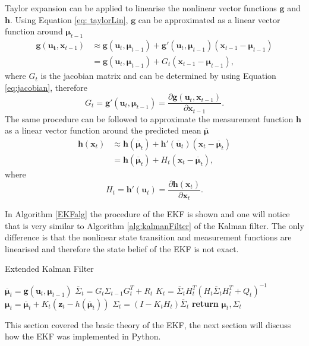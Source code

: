 \documentclass[12pt,oneside,openany,a4paper, %
afrikaans,english,
]{memoir}
\numberwithin{equation}{chapter}
\begin{document}
Taylor expansion can be applied to linearise the nonlinear vector functions $\bm{g}$ and $\bm{h}$. Using  Equation \ref{eq: taylorLin}, $\bm{g}$ can be approximated as a linear vector function around $\bm{\mu}_{t-1}$
\begin{equation}\label{eq:linear_taylor}
\begin{split}
\bm{g}(\bm{u_t}, \bm{x}_{t-1}) & \approx \bm{g}(\bm{u}_t, \bm{\mu}_{t-1}) + \bm{g}'(\bm{u}_t, \bm{\mu}_{t-1})(\bm{x}_{t-1} - \bm{\mu}_{t-1})\\
& = \bm{g}(\bm{u}_t, \bm{\mu}_{t-1}) + G_t(\bm{x}_{t-1} - 
\bm{\mu}_{t-1}),
\end{split}  
\end{equation}
where $G_t$ is the jacobian matrix and can be determined by using Equation \ref{eq:jacobian}, therefore
\begin{equation}\label{eq:Gt}
G_t = \bm{g}'(\bm{u}_t, \bm{\mu}_{t-1}) = \frac{\partial \bm{g}(\bm{u}_t, \bm{x}_{t-1})}{\partial \bm{x}_{t-1}}.
\end{equation}
The same procedure can be followed to approximate the measurement function $\bm{h}$ as a linear vector function around the predicted mean $\overline{\bm{\mu}}$
\begin{equation}
\begin{split}
\bm{h}(\bm{x}_{t}) & \approx \bm{h}(\bm{\overline{\mu}}_{t}) + \bm{h}'(\bm{\overline{u}}_t)(\bm{x}_{t} - \bm{\overline{\mu}}_{t})\\
& = \bm{h}(\bm{\overline{\mu}}_t) + H_t(\bm{x}_{t} - 
\bm{\overline{\mu}}_{t}),
\end{split}  
\end{equation}
where
\begin{equation}\label{eq:Ht}
H_t = \bm{h}'(\bm{u}_t) = \frac{\partial \bm{h}(\bm{x}_{t})}{\partial \bm{x}_{t}}.
\end{equation}

In Algorithm \ref{EKFalg} the procedure of the EKF is shown and one will notice that is very similar to Algorithm \ref{alg:kalmanFilter} of the Kalman filter. The only difference is that the nonlinear state transition and measurement functions are linearised and therefore the state belief of the EKF is not exact.




\begin{algorithm}
\caption{Extended Kalman Filter}\label{EKFalg}
\begin{algorithmic}[1]
\State $\overline{\bm{\mu}}_t = \bm{g}(\bm{u}_t, \bm{\mu}_{t-1})$
\State $\overline{\Sigma}_t = G_t \Sigma_{t-1} G_t^T + R_t$
\State $K_t = \overline{\Sigma}_t H_t^T(H_t\overline{\Sigma}_t H_t^T + Q_t)^{-1}$
\State $\bm{\mu}_t = \overline{\bm{\mu}}_t + K_t(\bm{z}_t - h(\overline{\bm{\mu}}_t))$
\State $\Sigma_t = (I - K_tH_t)\overline{\Sigma}_t$
\State \textbf{return} $\bm{\mu}_t, \Sigma_t$
\EndProcedure
\end{algorithmic}
\end{algorithm}
This section covered the basic theory of the EKF, the next section will discuss how the EKF was implemented in Python.
\end{document}
